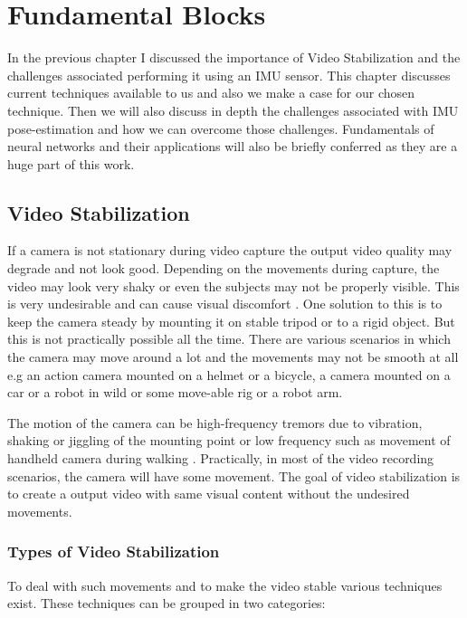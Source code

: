 \chapter{Fundamental Blocks} \label{chapter_two}

In the previous chapter I discussed the importance of Video Stabilization and the challenges associated performing it using an IMU sensor. This chapter discusses current techniques available to us and also we make a case for our chosen technique. Then we will also discuss in depth the challenges associated with IMU pose-estimation and how we can overcome those challenges. Fundamentals of neural networks and their applications will also be briefly conferred as they are a huge part of this work.

\section{Video Stabilization}
\label{sec:image_stab}
If a camera is not stationary during video capture the output video quality may degrade and not look good. Depending on the movements during capture, the video may look very shaky or even the subjects may not be properly visible. This is very undesirable and can cause visual discomfort \citep{jia2012probabilistic}. One solution to this is to keep the camera steady by mounting it on stable tripod or to a rigid object. But this is not practically possible all the time. There are various scenarios in which the camera may move around a lot and the movements may not be smooth at all e.g an action camera mounted on a helmet or a bicycle, a camera mounted on a car or a robot in wild or some move-able rig or a robot arm.

The motion of the camera can be high-frequency tremors due to vibration, shaking or jiggling of the mounting point \citep{ryu2012robust} or low frequency such as movement of handheld camera during walking \citep{dis_review}. Practically, in most of the video recording scenarios, the camera will have some movement. The goal of video stabilization is to create a output video with same visual content without the undesired movements. 

\subsection{Types of Video Stabilization}
To deal with such movements and to make the video stable various techniques exist. These techniques can be grouped in two categories:

